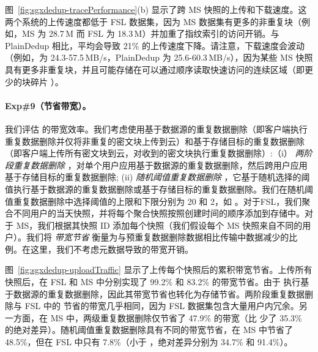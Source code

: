 图~\ref{fig:sgxdedup-tracePerformance}(b) 显示了跨 MS 快照的上传和下载速度。这两个系统的上传速度都低于 FSL 数据集，因为 MS 数据集有更多的非重复块（例如，MS 为 28.7\,M 而 FSL 为 18.3\,M）并加重了指纹索引的访问开销。与 PlainDedup 相比，\sysnameS 平均会导致 21\% 的上传速度下降。请注意，下载速度会波动（例如，\sysnameS 为 24.3-57.5\,MB/s，PlainDedup 为 25.6-60.3\,MB/s），因为某些 MS 快照具有更多非重复块，并且可能存储在可以通过顺序读取快速访问的连续区域（即更少的块碎片 \cite{lillibridge13}）。

\paragraph*{Exp\#9（节省带宽）。} 我们评估 \sysnameS 的带宽效率。我们考虑使用基于数据源的重复数据删除（即客户端执行重复数据删除并仅将非重复的密文块上传到云）和基于存储目标的重复数据删除（即客户端上传所有密文块到云，对收到的密文块执行重复数据删除）:（i）\textit{ 两阶段重复数据删除} \cite{li15}，对单个用户应用基于数据源的重复数据删除，然后跨用户应用基于存储目标的重复数据删除; (ii) \textit{ 随机阈值重复数据删除} \cite{harnik10}，它基于随机选择的阈值执行基于数据源的重复数据删除或基于存储目标的重复数据删除。我们在随机阈值重复数据删除中选择阈值的上限和下限分别为 20 和 2，如 \cite{harnik10}。对于FSL，我们聚合不同用户的当天快照，并将每个聚合快照按照创建时间的顺序添加到存储中。对于 MS，我们根据其快照 ID 添加每个快照（我们假设每个 MS 快照来自不同的用户）。我们将 \textit{ 带宽节省} 衡量为与预重复数据删除数据相比传输中数据减少的比例。在这里，我们不考虑元数据导致的带宽开销。

图~\ref{fig:sgxdedup-uploadTraffic} 显示了上传每个快照后的累积带宽节省。上传所有快照后，\sysnameS 在 FSL 和 MS 中分别实现了 99.2\% 和 83.2\% 的带宽节省。由于 \sysnameS 执行基于数据源的重复数据删除，因此其带宽节省也转化为存储节省。两阶段重复数据删除与 FSL 中的 \sysnameS 节省的带宽几乎相同，因为 FSL 数据集包含大量用户内冗余。另一方面，在 MS 中，两级重复数据删除仅节省了 47.9\% 的带宽（比 \sysnameS 少了 35.3\% 的绝对差异）。随机阈值重复数据删除具有不同的带宽节省，在 MS 中节省了 48.5\%，但在 FSL 中只有 7.8\%（小于 \sysnameS，绝对差异分别为 34.7\% 和 91.4\%）。

